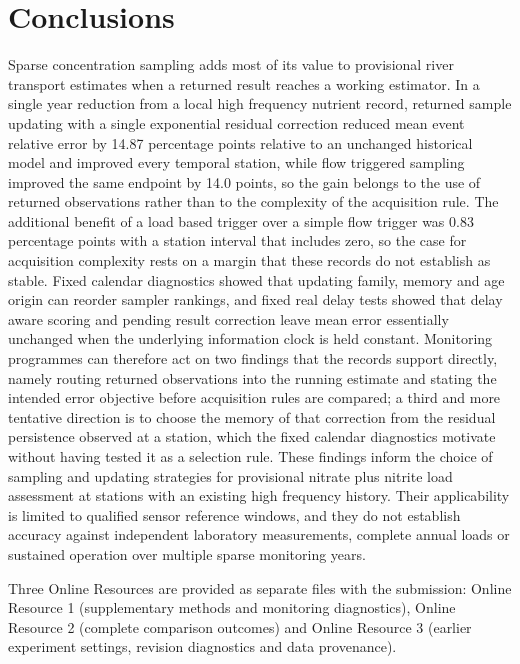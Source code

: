 \documentclass[lineno,pdflatex,sn-apa]{sn-jnl}%
\theoremstyle{thmstyleone}%
\theoremstyle{thmstyletwo}%
\theoremstyle{thmstylethree}%
\begin{document}
\section{Conclusions}\label{sec:conclusions}

Sparse concentration sampling adds most of its value to provisional river transport estimates when a returned result reaches a working estimator. In a single year reduction from a local high frequency nutrient record, returned sample updating with a single exponential residual correction reduced mean event relative error by 14.87 percentage points relative to an unchanged historical model and improved every temporal station, while flow triggered sampling improved the same endpoint by 14.0 points, so the gain belongs to the use of returned observations rather than to the complexity of the acquisition rule. The additional benefit of a load based trigger over a simple flow trigger was 0.83 percentage points with a station interval that includes zero, so the case for acquisition complexity rests on a margin that these records do not establish as stable. Fixed calendar diagnostics showed that updating family, memory and age origin can reorder sampler rankings, and fixed real delay tests showed that delay aware scoring and pending result correction leave mean error essentially unchanged when the underlying information clock is held constant. Monitoring programmes can therefore act on two findings that the records support directly, namely routing returned observations into the running estimate and stating the intended error objective before acquisition rules are compared; a third and more tentative direction is to choose the memory of that correction from the residual persistence observed at a station, which the fixed calendar diagnostics motivate without having tested it as a selection rule. These findings inform the choice of sampling and updating strategies for provisional nitrate plus nitrite load assessment at stations with an existing high frequency history. Their applicability is limited to qualified sensor reference windows, and they do not establish accuracy against independent laboratory measurements, complete annual loads or sustained operation over multiple sparse monitoring years.

\clearpage

\backmatter


Three Online Resources are provided as separate files with the submission: Online Resource 1 (supplementary methods and monitoring diagnostics), Online Resource 2 (complete comparison outcomes) and Online Resource 3 (earlier experiment settings, revision diagnostics and data provenance).
\end{document}
